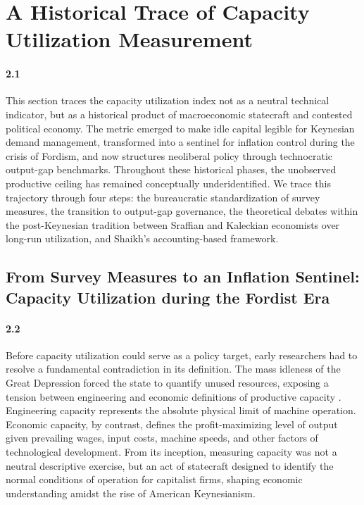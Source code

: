 \section{A Historical Trace of Capacity Utilization Measurement}
\label{sec:literature_review}

\paragraph{2.1}
This section traces the capacity utilization index not as a neutral technical indicator, but as a historical product of macroeconomic statecraft and contested political economy. The metric emerged to make idle capital legible for Keynesian demand management, transformed into a sentinel for inflation control during the crisis of Fordism, and now structures neoliberal policy through technocratic output-gap benchmarks. Throughout these historical phases, the unobserved productive ceiling has remained conceptually underidentified. We trace this trajectory through four steps: the bureaucratic standardization of survey measures, the transition to output-gap governance, the theoretical debates within the post-Keynesian tradition between Sraffian and Kaleckian economists over long-run utilization, and Shaikh’s accounting-based framework.

\subsection{From Survey Measures to an Inflation Sentinel: Capacity Utilization during the Fordist Era}
\label{subsec:fordist_survey_statecraft}

\paragraph{2.2}
Before capacity utilization could serve as a policy target, early researchers had to resolve a fundamental contradiction in its definition. The mass idleness of the Great Depression forced the state to quantify unused resources, exposing a tension between engineering and economic definitions of productive capacity \citep{Burns1954, KleinDavid1958}. Engineering capacity represents the absolute physical limit of machine operation. Economic capacity, by contrast, defines the profit-maximizing level of output given prevailing wages, input costs, machine speeds, and other factors of technological development. From its inception, measuring capacity was not a neutral descriptive exercise, but an act of statecraft designed to identify the normal conditions of operation for capitalist firms, shaping economic understanding amidst the rise of American Keynesianism.

